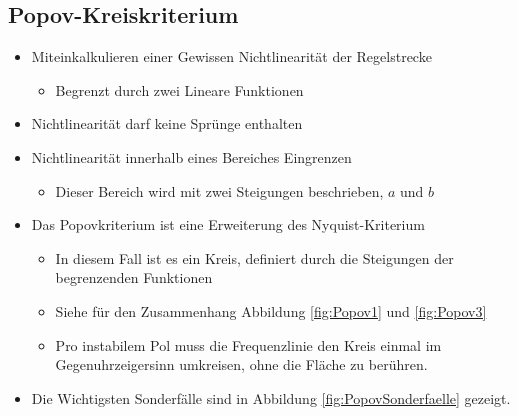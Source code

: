 \subsection{Popov-Kreiskriterium}
\begin{itemize}
	\item Miteinkalkulieren einer Gewissen Nichtlinearität der Regelstrecke
	\begin{itemize}
		\item Begrenzt durch zwei Lineare Funktionen
	\end{itemize}
	\item Nichtlinearität darf keine Sprünge enthalten
	\item Nichtlinearität innerhalb eines Bereiches Eingrenzen
	\begin{itemize}
		\item Dieser Bereich wird mit zwei Steigungen beschrieben, $a$ und $b$
	\end{itemize}
	\item Das Popovkriterium ist eine Erweiterung des Nyquist-Kriterium
	\begin{itemize}
		\item In diesem Fall ist es ein Kreis, definiert durch die Steigungen der begrenzenden Funktionen
		\item Siehe für den Zusammenhang  Abbildung \ref{fig:Popov1} und \ref{fig:Popov3}
		\item Pro instabilem Pol muss die Frequenzlinie den Kreis einmal im Gegenuhrzeigersinn umkreisen, ohne die Fläche zu berühren.
	\end{itemize}
	\item Die Wichtigsten Sonderfälle sind in Abbildung \ref{fig:PopovSonderfaelle} gezeigt. 
\end{itemize}
